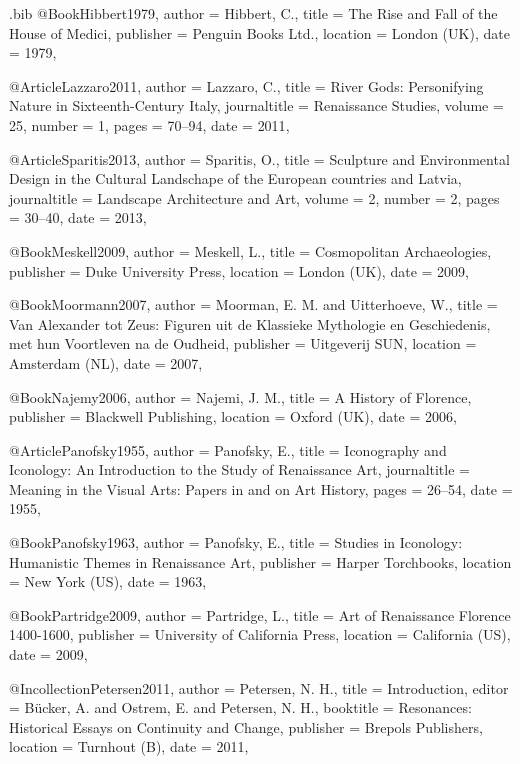 \begin{filecontents}{\IJSRAidentifier.bib}
@Book{Hibbert1979,
  author    = {Hibbert, C.},
  title     = {The Rise and Fall of the House of Medici},
  publisher = {Penguin Books Ltd.},
  location  = {London (UK)},
  date      = {1979},
}

@Article{Lazzaro2011,
  author       = {Lazzaro, C.},
  title        = {River Gods: Personifying Nature in Sixteenth-Century Italy},
  journaltitle = {Renaissance Studies},
  volume       = {25},
  number       = {1},
  pages        = {70--94},
  date         = {2011},
}

@Article{Sparitis2013,
  author       = {Sparitis, O.},
  title        = {Sculpture and Environmental Design in the Cultural Landschape of the European countries and Latvia},
  journaltitle = {Landscape Architecture and Art},
  volume       = {2},
  number       = {2},
  pages        = {30--40},
  date         = {2013},
}

@Book{Meskell2009,
  author    = {Meskell, L.},
  title     = {Cosmopolitan Archaeologies},
  publisher = {Duke University Press},
  location  = {London (UK)},
  date      = {2009},
}

@Book{Moormann2007,
  author    = {Moorman, E. M. and Uitterhoeve, W.},
  title     = {Van Alexander tot Zeus: Figuren uit de Klassieke Mythologie en Geschiedenis, met hun Voortleven na de Oudheid},
  publisher = {Uitgeverij SUN},
  location  = {Amsterdam (NL)},
  date      = {2007},
}

@Book{Najemy2006,
  author    = {Najemi, J. M.},
  title     = {A History of Florence},
  publisher = {Blackwell Publishing},
  location  = {Oxford (UK)},
  date      = {2006},
}

@Article{Panofsky1955,
  author       = {Panofsky, E.},
  title        = {Iconography and Iconology: An Introduction to the Study of Renaissance Art},
  journaltitle = {Meaning in the Visual Arts: Papers in and on Art History},
  pages        = {26--54},
  date         = {1955},
}

@Book{Panofsky1963,
  author    = {Panofsky, E.},
  title     = {Studies in Iconology: Humanistic Themes in Renaissance Art},
  publisher = {Harper Torchbooks},
  location  = {New York (US)},
  date      = {1963},
}

@Book{Partridge2009,
  author    = {Partridge, L.},
  title     = {Art of Renaissance Florence 1400-1600},
  publisher = {University of California Press},
  location  = {California (US)},
  date      = {2009},
}

@Incollection{Petersen2011,
  author    = {Petersen, N. H.},
  title     = {Introduction},
  editor    = {Bücker, A. and Ostrem, E. and Petersen, N. H.},
  booktitle = {Resonances: Historical Essays on Continuity and Change},
  publisher = {Brepols Publishers},
  location  = {Turnhout (B)},
  date      = {2011},
}


\end{filecontents}
